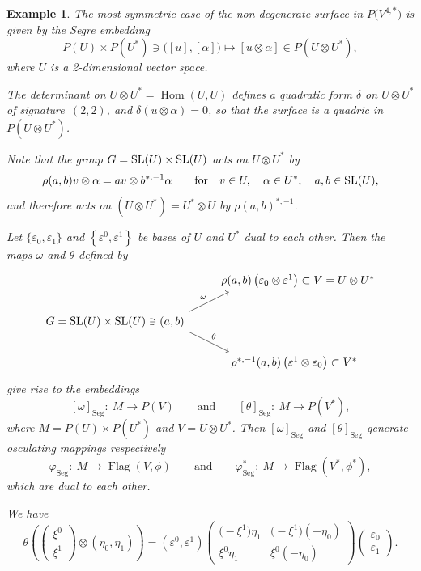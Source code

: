 \documentclass[10pt,a4paper]{amsart}
\newcommand{\Flag}{\operatorname{Flag}}
\newcommand{\Hom}{\operatorname{Hom}}
\newtheorem{ex}[thm]{Example}
\numberwithin{equation}{section}
\begin{document}
\begin{ex}
The most symmetric case of the non-degenerate surface in $P\big(V^{4,*}\big)$ is given by the Segre embedding
\[
P(U)\times P(U^*) \ni \big([u],[\alpha]\big)\mapsto [u\otimes\alpha]\in P(U\otimes U^*),
\]
where $U$ is a 2-dimensional vector space.

The determinant on $U\otimes U^*=\Hom(U,U)$ defines a quadratic form $\delta$ on $U\otimes U^*$ of signa\-ture~$(2,2)$, and $\delta(u\otimes \alpha)=0$, so that the surface is a quadric in $P(U\otimes U^*)$.

Note that the group $G={\rm SL}(U)\times {\rm SL}(U)$ acts on $U\otimes U^*$ by
\[
\rho(a,b)v\otimes \alpha = av\otimes b^{*,-1}\alpha\qquad\text{for}\quad
v\in U,\quad \alpha\in U^*,\quad a,b\in {\rm SL}(U),
\]
and therefore acts on $(U\otimes U^*) = U^*\otimes U$ by $\rho(a,b)^{*,-1}$.

Let $\{\varepsilon_0,\varepsilon_1\}$ and $\left\{\varepsilon^0,\varepsilon^1\right\}$ be bases of $U$ and $U^*$ dual to each other. Then the maps $\omega$ and $\theta$ defined by
\[
\begin{tikzcd}
& \rho(a,b)\left(\varepsilon_0\otimes \varepsilon^{1}\right)\subset V=U\otimes U^* \\
G={\rm SL}(U)\times {\rm SL}(U)\ni(a,b)
\arrow[ur, "\omega", start anchor={[xshift=6ex]}, end anchor={[xshift=-4ex]}]
\arrow[dr, "\theta", start anchor={[xshift=6ex]}, end anchor={[xshift=-4ex]}] & \\
& \!\!\!\!\rho^{*,-1}(a,b)\left(\varepsilon^1\otimes \varepsilon_0\right)\subset V^*
\end{tikzcd}
\]
give rise to the embeddings
\[
[\omega]_{\text{Seg}}\colon\ M\to P(V)\qquad\text{and}\qquad
[\theta]_{\text{Seg}}\colon\ M\to P(V^*),
\]
where $M=P(U)\times P(U^*)$ and $V=U\otimes U^*$. Then $[\omega]_{\text{Seg}}$ and $[\theta]_{\text{Seg}}$ generate osculating mappings respectively
\[
\varphi_{\text{Seg}}\colon\ M \to \Flag(V,\phi)\qquad\text{and}\qquad
\varphi_{\text{Seg}}^*\colon\ M\to\Flag(V^*,\phi^*),
\]
which are dual to each other.

We have
\[
\theta \left( \begin{pmatrix}\xi^0\\\xi^1\end{pmatrix}\otimes (\eta_0, \eta_1)\right) =
\left(\varepsilon^0,\varepsilon^1\right)
\begin{pmatrix}
\big({-}\xi^1\big)\eta_1 & \big({-}\xi^1\big)(-\eta_0) \\
\xi^0\eta_1 & \xi^0(-\eta_0)
\end{pmatrix}
\begin{pmatrix}
\varepsilon_0 \\
\varepsilon_1
\end{pmatrix}\!.
\]


\end{ex}
\end{document}
